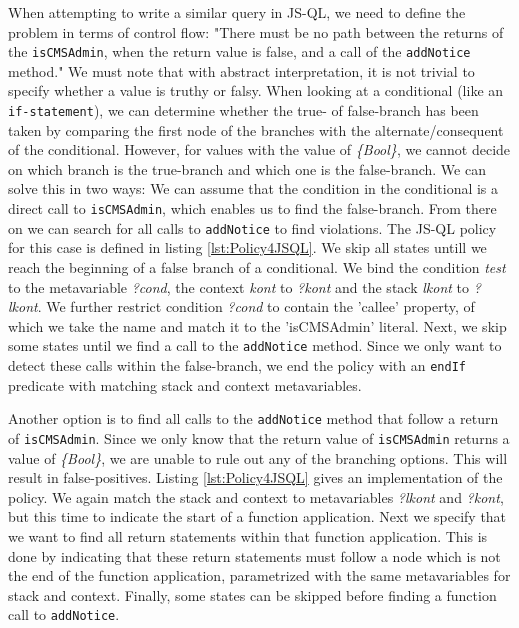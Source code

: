 When attempting to write a similar query in JS-QL, we need to define the problem in terms of control flow: "There must be no path between the returns of the \texttt{isCMSAdmin}, when the return value is false, and a call of the \texttt{addNotice} method." We must note that with abstract interpretation, it is not trivial to specify whether a value is truthy or falsy. When looking at a conditional (like an \texttt{if-statement}), we can determine whether the true- of false-branch has been taken by comparing the first node of the branches with the alternate/consequent of the conditional. However, for values with the value of \textit{\{Bool\}}, we cannot decide on which branch is the true-branch and which one is the false-branch. We can solve this in two ways: We can assume that the condition in the conditional is a direct call to \texttt{isCMSAdmin}, which enables us to find the false-branch. From there on we can search for all calls to \texttt{addNotice} to find violations. The JS-QL policy for this case is defined in listing \ref{lst:Policy4JSQL}. We skip all states untill we reach the beginning of a false branch of a conditional. We bind the condition \textit{test} to the metavariable \textit{?cond}, the context \textit{kont} to \textit{?kont} and the stack \textit{lkont} to \textit{?lkont}. We further restrict condition \textit{?cond} to contain the 'callee' property, of which we take the name and match it to the 'isCMSAdmin' literal. Next, we skip some states until we find a call to the \texttt{addNotice} method. Since we only want to detect these calls within the false-branch, we end the policy with an \texttt{endIf} predicate with matching stack and context metavariables.

Another option is to find all calls to the \texttt{addNotice} method that follow a return of \texttt{isCMSAdmin}. Since we only know that the return value of \texttt{isCMSAdmin} returns a value of \textit{\{Bool\}}, we are unable to rule out any of the branching options. This will result in false-positives. Listing \ref{lst:Policy4JSQL} gives an implementation of the policy. We again match the stack and context to metavariables \textit{?lkont} and \textit{?kont}, but this time to indicate the start of a function application. Next we specify that we want to find all return statements within that function application. This is done by indicating that these return statements must follow a node which is not the end of the function application, parametrized with the same metavariables for stack and context. Finally, some states can be skipped before finding a function call to \texttt{addNotice}.

